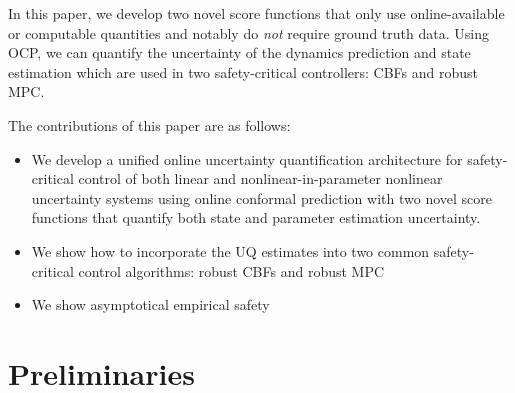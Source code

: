 \documentclass[letterpaper, 10 pt, conference]{ieeeconf}  %
\begin{document}
In this paper, we develop two novel score functions that only use online-available or computable quantities and notably do \textit{not} require ground truth data. Using OCP, we can quantify the uncertainty of the dynamics prediction and state estimation which are used in two safety-critical controllers: CBFs and robust MPC.

The contributions of this paper are as follows:
\begin{itemize}
    \item We develop a unified online uncertainty quantification architecture for safety-critical control of both linear and nonlinear-in-parameter nonlinear uncertainty systems using online conformal prediction with two novel score functions that quantify both state and parameter estimation uncertainty.
    \item We show how to incorporate the UQ estimates into two common safety-critical control algorithms: robust CBFs and robust MPC
    \item We show asymptotical empirical safety
\end{itemize}


\section{Preliminaries}


\end{document}
